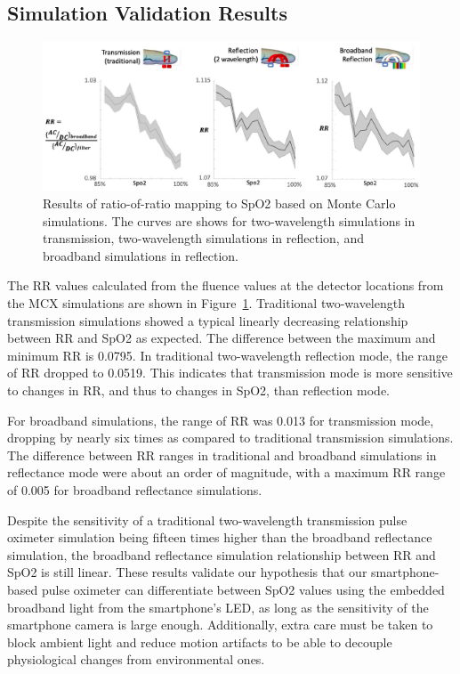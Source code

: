     \subsection{Simulation Validation Results}
    \begin{figure}
        \begin{center}
        \includegraphics[width=\textwidth]{fig/moxi/D3RR.pdf}
        \end{center}
        \caption{Results of ratio-of-ratio mapping to SpO2 based on Monte Carlo simulations. The curves are shows for two-wavelength simulations in transmission, two-wavelength simulations in reflection, and broadband simulations in reflection.} 
        \label{fig:D3RR}
    \end{figure}
    The RR values calculated from the fluence values at the detector locations from the MCX simulations are shown in Figure~\ref{fig:D3RR}. Traditional two-wavelength transmission simulations showed a typical linearly decreasing relationship between RR and SpO2 as expected. The difference between the maximum and minimum RR is 0.0795. In traditional two-wavelength reflection mode, the range of RR dropped to 0.0519. This indicates that transmission mode is more sensitive to changes in RR, and thus to changes in SpO2, than reflection mode. 
    
    For broadband simulations, the range of RR was 0.013 for transmission mode, dropping by nearly six times as compared to traditional transmission simulations. The difference between RR ranges in traditional and broadband simulations in reflectance mode were about an order of magnitude, with a maximum RR range of 0.005 for broadband reflectance simulations. 
    
    Despite the sensitivity of a traditional two-wavelength transmission pulse oximeter simulation being fifteen times higher than the broadband reflectance simulation, the broadband reflectance simulation relationship between RR and SpO2 is still linear. These results validate our hypothesis that our smartphone-based pulse oximeter can differentiate between SpO2 values using the embedded broadband light from the smartphone's LED, as long as the sensitivity of the smartphone camera is large enough. Additionally, extra care must be taken to block ambient light and reduce motion artifacts to be able to decouple physiological changes from environmental ones. 

